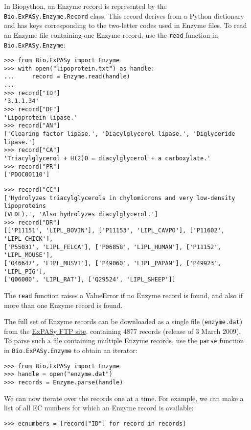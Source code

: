 In Biopython, an Enzyme record is represented by the \verb|Bio.ExPASy.Enzyme.Record| class. This record derives from a Python dictionary and has keys corresponding to the two-letter codes used in Enzyme files. To read an Enzyme file containing one Enzyme record, use the \verb+read+ function in \verb|Bio.ExPASy.Enzyme|:

\begin{verbatim}
>>> from Bio.ExPASy import Enzyme
>>> with open("lipoprotein.txt") as handle:
...     record = Enzyme.read(handle)
...
>>> record["ID"]
'3.1.1.34'
>>> record["DE"]
'Lipoprotein lipase.'
>>> record["AN"]
['Clearing factor lipase.', 'Diacylglycerol lipase.', 'Diglyceride lipase.']
>>> record["CA"]
'Triacylglycerol + H(2)O = diacylglycerol + a carboxylate.'
>>> record["PR"]
['PDOC00110']
\end{verbatim}
\begin{verbatim}
>>> record["CC"]
['Hydrolyzes triacylglycerols in chylomicrons and very low-density lipoproteins
(VLDL).', 'Also hydrolyzes diacylglycerol.']
>>> record["DR"]
[['P11151', 'LIPL_BOVIN'], ['P11153', 'LIPL_CAVPO'], ['P11602', 'LIPL_CHICK'],
['P55031', 'LIPL_FELCA'], ['P06858', 'LIPL_HUMAN'], ['P11152', 'LIPL_MOUSE'],
['O46647', 'LIPL_MUSVI'], ['P49060', 'LIPL_PAPAN'], ['P49923', 'LIPL_PIG'],
['Q06000', 'LIPL_RAT'], ['Q29524', 'LIPL_SHEEP']]
\end{verbatim}
The \verb+read+ function raises a ValueError if no Enzyme record is found, and also if more than one Enzyme record is found.

The full set of Enzyme records can be downloaded as a single file (\verb|enzyme.dat|) from the \href{ftp://ftp.expasy.org/databases/enzyme/enzyme.dat}{ExPASy FTP site}, containing 4877 records (release of 3 March 2009). To parse such a file containing multiple Enzyme records, use the \verb+parse+ function in \verb+Bio.ExPASy.Enzyme+ to obtain an iterator:

\begin{verbatim}
>>> from Bio.ExPASy import Enzyme
>>> handle = open("enzyme.dat")
>>> records = Enzyme.parse(handle)
\end{verbatim}

We can now iterate over the records one at a time. For example, we can make a list of all EC numbers for which an Enzyme record is available:
\begin{verbatim}
>>> ecnumbers = [record["ID"] for record in records]
\end{verbatim}

